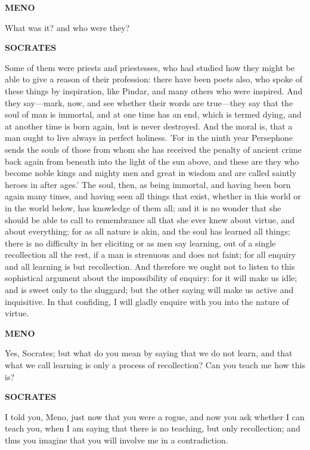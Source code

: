 \documentclass[11pt,letter]{article}
\begin{document}
\par \textbf{MENO}
\par   What was it? and who were they?

\par \textbf{SOCRATES}
\par   Some of them were priests and priestesses, who had studied how they might be able to give a reason of their profession:  there have been poets also, who spoke of these things by inspiration, like Pindar, and many others who were inspired. And they say—mark, now, and see whether their words are true—they say that the soul of man is immortal, and at one time has an end, which is termed dying, and at another time is born again, but is never destroyed. And the moral is, that a man ought to live always in perfect holiness. 'For in the ninth year Persephone sends the souls of those from whom she has received the penalty of ancient crime back again from beneath into the light of the sun above, and these are they who become noble kings and mighty men and great in wisdom and are called saintly heroes in after ages.' The soul, then, as being immortal, and having been born again many times, and having seen all things that exist, whether in this world or in the world below, has knowledge of them all; and it is no wonder that she should be able to call to remembrance all that she ever knew about virtue, and about everything; for as all nature is akin, and the soul has learned all things; there is no difficulty in her eliciting or as men say learning, out of a single recollection all the rest, if a man is strenuous and does not faint; for all enquiry and all learning is but recollection. And therefore we ought not to listen to this sophistical argument about the impossibility of enquiry:  for it will make us idle; and is sweet only to the sluggard; but the other saying will make us active and inquisitive. In that confiding, I will gladly enquire with you into the nature of virtue.

\par \textbf{MENO}
\par   Yes, Socrates; but what do you mean by saying that we do not learn, and that what we call learning is only a process of recollection? Can you teach me how this is?

\par \textbf{SOCRATES}
\par   I told you, Meno, just now that you were a rogue, and now you ask whether I can teach you, when I am saying that there is no teaching, but only recollection; and thus you imagine that you will involve me in a contradiction.
\end{document}
